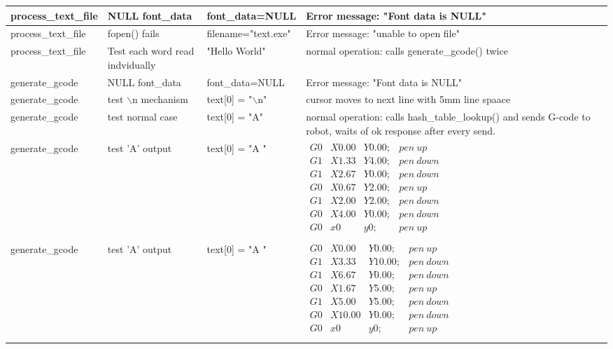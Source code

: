 \begin{longtable}{|>{\raggedright\arraybackslash}m{}|>{\raggedright\arraybackslash}m{}|>{\raggedright\arraybackslash}m{}|>{\raggedright\arraybackslash}m{}|}
    process\_text\_file & NULL font\_data & font\_data=NULL & Error message: "Font data is NULL" \\ \hline
    process\_text\_file & fopen() fails & filename="text.exe" & Error message: "unable to open file" \\ \hline
    process\_text\_file & Test each word read indvidually & "Hello World" &  normal operation: calls generate\_gcode() twice \\ \hline
    generate\_gcode & NULL font\_data & font\_data=NULL & Error message: "Font data is NULL" \\ \hline
    generate\_gcode & test $\backslash$n mechanism & text[0] = "$\backslash$n" & cursor moves to next line with 5mm line spaace\\ \hline
    generate\_gcode & test normal case & text[0] = "A" &  normal operation: calls hash\_table\_lookup() and sends G-code to robot, waits of ok response after every send. \\ \hline
    generate\_gcode & 4mm test 'A' output & text[0] = "A " & \footnotesize$\begin{array}{cccl}
        G0 &X0.00 &Y0.00; & pen\ up\\
        G1 &X1.33 &Y4.00; & pen\ down\\
        G1 &X2.67 &Y0.00; & pen\ down\\
        G0 &X0.67 &Y2.00; & pen\ up\\
        G1 &X2.00 &Y2.00; & pen\ down\\
        G0 &X4.00 &Y0.00; & pen\ down\\
        G0 &x0 &y0; & pen\ up\\
        \end{array}$ \\ \hline
    generate\_gcode & 10mm test 'A' output & text[0] = "A " & \footnotesize$\begin{array}{cccl}
        G0 &X0.00 &Y0.00; & pen\ up\\
        G1 &X3.33 &Y10.00; & pen\ down\\
        G1 &X6.67 &Y0.00; & pen\ down\\
        G0 &X1.67 &Y5.00; & pen\ up\\
        G1 &X5.00 &Y5.00; & pen\ down\\
        G0 &X10.00 &Y0.00; & pen\ down\\
        G0 &x0 &y0; & pen\ up\\
        \end{array}$ \\ \hline

\end{longtable}
